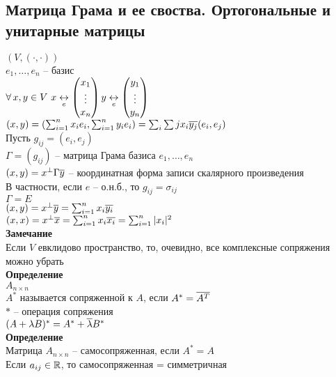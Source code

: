 \documentclass[12pt]{article}
\begin{document}
\subsection{Матрица Грама и ее своства. Ортогональные и унитарные матрицы}
$(V, (\cdot, \cdot))$\\
$e_1, \ldots, e_n$ -- базис\\
$\forall\, x,y \in V\ x \underset e {\leftrightarrow} \begin{pmatrix}
    x_1\\\vdots\\x_n\\
\end{pmatrix}\\
    y \underset e {\leftrightarrow} \begin{pmatrix}
        y_1\\\vdots\\y_n
\end{pmatrix}$\\
$(x,y) = (\sum_{i=1}^n x_i e_i, \sum_{i=1}^n y_ie_i) = \sum_i \sum j x_i \overline{y_j} (e_i, e_j)$\\
Пусть $g_{ij} = (e_i, e_j)$\\
$\Gamma = (g_{ij})$ -- матрица Грама базиса $e_1, \ldots, e_n$\\
$(x,y) = x^\perp \Gamma \overline y$ -- координатная форма записи скалярного произведения\\
В частности, если $e$ -- о.н.б., то $g_{ij} = \sigma_{ij}$\\
$\Gamma = E$\\
$(x, y) = x^\perp \overline y = \sum_{i=1}^n x_i \overline{y_i}$\\
$(x,x) = x^\perp \overline x = \sum_{i=1}^n x_i \overline{x_i} = \sum_{i=1}^n |x_i|^2$\\
\textbf{Замечание}\\
Если $V$ евклидово пространство, то, очевидно, все комплексные сопряжения можно убрать\\
\textbf{Определение}\\
$A_{n\times n}$\\
$A^*$ называется сопряженной к $A$, если $A^* = \overline{A^T}$\\
$*$ -- операция сопряжения\\
$(A+\lambda B)^* = A^* + \overline \lambda B^*$\\
\textbf{Определение}\\
Матрица $A_{n \times n}$ -- самосопряженная, если $A^* = A$\\
Если $a_{ij} \in \mathbb{R}$, то самосопряженная = симметричная\\
\end{document}
